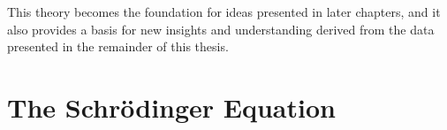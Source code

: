 This theory becomes the foundation for ideas presented in later chapters, and it also provides a basis for new insights and understanding derived from the data presented in the remainder of this thesis.



%
%
%
%
%

\section{The Schr\"{o}dinger Equation}

